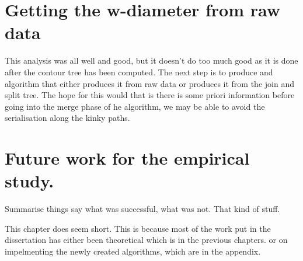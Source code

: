 \section{Getting the w-diameter from raw data}

This analysis was all well and good, but it doesn't do too much good as it is done after the contour tree has been computed. The next step is to produce and algorithm that either produces it from raw data or produces it from the join and split tree. The hope for this would that is there is some priori information before going into the merge phase of he algorithm, we may be able to avoid the serialisation along the kinky paths.

\section{Future work for the empirical study.}

Summarise things say what was successful, what was not. That kind of stuff.

This chapter does seem short. This is because most of the work put in the dissertation has either been theoretical which is in the previous chapters. or on impelmenting the newly created algorithms, which are in the appendix.

